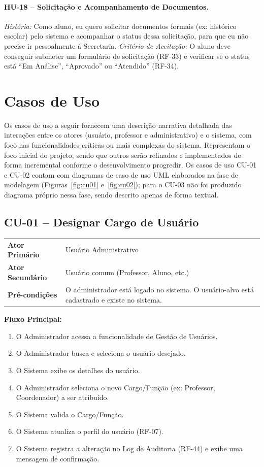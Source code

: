\paragraph{HU-18 -- Solicitação e Acompanhamento de Documentos.}
\textit{História:} Como aluno, eu quero solicitar documentos formais (ex:
histórico escolar) pelo sistema e acompanhar o status dessa solicitação,
para que eu não precise ir pessoalmente à Secretaria.
\textit{Critério de Aceitação:} O aluno deve conseguir submeter um
formulário de solicitação (RF-33) e verificar se o status está ``Em
Análise'', ``Aprovado'' ou ``Atendido'' (RF-34).

\section{Casos de Uso}

Os casos de uso a seguir fornecem uma descrição narrativa detalhada das
interações entre os atores (usuário, professor e administrativo) e o
sistema, com foco nas funcionalidades críticas ou mais complexas do
sistema. Representam o foco inicial do projeto, sendo que outros serão
refinados e implementados de forma incremental conforme o desenvolvimento
progredir. Os casos de uso CU-01 e CU-02 contam com diagramas de caso de uso
UML elaborados na fase de modelagem (Figuras~\ref{fig:cu01} e~\ref{fig:cu02});
para o CU-03 não foi produzido diagrama próprio nessa fase, sendo descrito
apenas de forma textual.

\subsection*{CU-01 -- Designar Cargo de Usuário}

\begin{tabularx}{\textwidth}{p{} X}
\toprule
\textbf{Ator Primário} & Usuário Administrativo \\
\textbf{Ator Secundário} & Usuário comum (Professor, Aluno, etc.) \\
\textbf{Pré-condições} & O administrador está logado no sistema. O usuário-alvo está cadastrado e existe no sistema. \\
\bottomrule
\end{tabularx}

\textbf{Fluxo Principal:}
\begin{enumerate}[nosep]
    \item O Administrador acessa a funcionalidade de Gestão de Usuários.
    \item O Administrador busca e seleciona o usuário desejado.
    \item O Sistema exibe os detalhes do usuário.
    \item O Administrador seleciona o novo Cargo/Função (ex: Professor, Coordenador) a ser atribuído.
    \item O Sistema valida o Cargo/Função.
    \item O Sistema atualiza o perfil do usuário (RF-07).
    \item O Sistema registra a alteração no Log de Auditoria (RF-44) e exibe uma mensagem de confirmação.
\end{enumerate}

